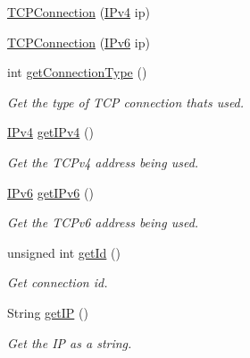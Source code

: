 \begin{DoxyCompactItemize}
\item 
\hyperlink{class_rad_jav_1_1_networking_1_1_t_c_p_connection_a484a982e225dad458692f14e956aa636}{T\+C\+P\+Connection} (\hyperlink{class_rad_jav_1_1_networking_1_1_i_pv4}{I\+Pv4} ip)
\item 
\hyperlink{class_rad_jav_1_1_networking_1_1_t_c_p_connection_a6f792372ebe8f324cfaff8b2de2b3380}{T\+C\+P\+Connection} (\hyperlink{class_rad_jav_1_1_networking_1_1_i_pv6}{I\+Pv6} ip)
\item 
int \hyperlink{class_rad_jav_1_1_networking_1_1_t_c_p_connection_aef3ece4eaa3b5c216a83b72a70c7f897}{get\+Connection\+Type} ()
\begin{DoxyCompactList}\small\item\em Get the type of T\+CP connection that\textquotesingle{}s used. \end{DoxyCompactList}\item 
\hyperlink{class_rad_jav_1_1_networking_1_1_i_pv4}{I\+Pv4} \hyperlink{class_rad_jav_1_1_networking_1_1_t_c_p_connection_ad9a925fc0d6842a0cd129e1588e98c04}{get\+I\+Pv4} ()
\begin{DoxyCompactList}\small\item\em Get the T\+C\+Pv4 address being used. \end{DoxyCompactList}\item 
\hyperlink{class_rad_jav_1_1_networking_1_1_i_pv6}{I\+Pv6} \hyperlink{class_rad_jav_1_1_networking_1_1_t_c_p_connection_aba9f2205396096c08d87e470fb0ab5f1}{get\+I\+Pv6} ()
\begin{DoxyCompactList}\small\item\em Get the T\+C\+Pv6 address being used. \end{DoxyCompactList}\item 
unsigned int \hyperlink{class_rad_jav_1_1_networking_1_1_t_c_p_connection_ae4640ad69e50025686af707c2769d731}{get\+Id} ()
\begin{DoxyCompactList}\small\item\em Get connection id. \end{DoxyCompactList}\item 
String \hyperlink{class_rad_jav_1_1_networking_1_1_t_c_p_connection_a369cebce11eb546b1bcb19ac3be4952d}{get\+IP} ()
\begin{DoxyCompactList}\small\item\em Get the IP as a string. \end{DoxyCompactList}\end{DoxyCompactItemize}

